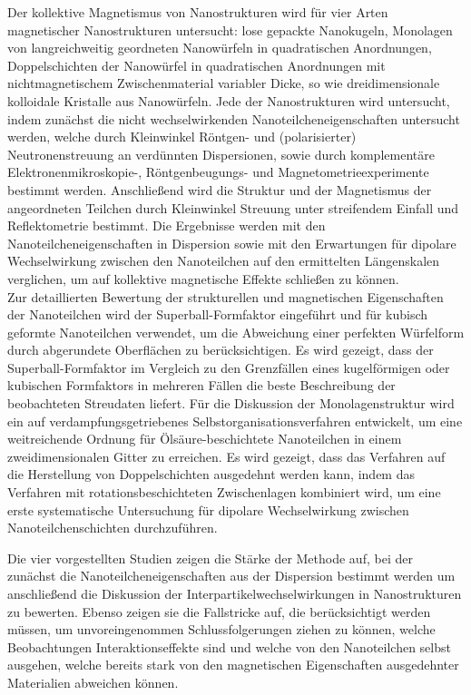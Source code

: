 \documentclass[\main/dresen_thesis.tex]{subfiles}
\begin{document}
  Der kollektive Magnetismus von Nanostrukturen wird für vier Arten magnetischer Nanostrukturen untersucht: lose gepackte Nanokugeln, Monolagen von langreichweitig geordneten Nanowürfeln in quadratischen Anordnungen, Doppelschichten der Nanowürfel in quadratischen Anordnungen mit nichtmagnetischem Zwischenmaterial variabler Dicke, so wie dreidimensionale kolloidale Kristalle aus Nanowürfeln.
  Jede der Nanostrukturen wird untersucht, indem zunächst die nicht wechselwirkenden Nanoteilcheneigenschaften untersucht werden, welche durch Kleinwinkel Röntgen- und (polarisierter) Neutronenstreuung an verdünnten Dispersionen, sowie durch komplementäre Elektronenmikroskopie-, Röntgenbeugungs- und Magnetometrieexperimente bestimmt werden.
  Anschließend wird die Struktur und der Magnetismus der angeordneten Teilchen durch Kleinwinkel Streuung unter streifendem Einfall und Reflektometrie bestimmt.
  Die Ergebnisse werden mit den Nanoteilcheneigenschaften in Dispersion sowie mit den Erwartungen für dipolare Wechselwirkung zwischen den Nanoteilchen auf den ermittelten Längenskalen verglichen, um auf kollektive magnetische Effekte schließen zu können.
  \\

  Zur detaillierten Bewertung der strukturellen und magnetischen Eigenschaften der Nanoteilchen wird der Superball-Formfaktor eingeführt und für kubisch geformte Nanoteilchen verwendet, um die Abweichung einer perfekten Würfelform durch abgerundete Oberflächen zu berücksichtigen.
  Es wird gezeigt, dass der Superball-Formfaktor im Vergleich zu den Grenzfällen eines kugelförmigen oder kubischen Formfaktors in mehreren Fällen die beste Beschreibung der beobachteten Streudaten liefert.
  Für die Diskussion der Monolagenstruktur wird ein auf verdampfungsgetriebenes Selbstorganisationsverfahren entwickelt, um eine weitreichende Ordnung für Ölsäure-beschichtete Nanoteilchen in einem zweidimensionalen Gitter zu erreichen.
  Es wird gezeigt, dass das Verfahren auf die Herstellung von Doppelschichten ausgedehnt werden kann, indem das Verfahren mit rotationsbeschichteten Zwischenlagen kombiniert wird, um eine erste systematische Untersuchung für dipolare Wechselwirkung zwischen Nanoteilchenschichten durchzuführen.

  Die vier vorgestellten Studien zeigen die Stärke der Methode auf, bei der zunächst die Nanoteilcheneigenschaften aus der Dispersion bestimmt werden um anschließend die Diskussion der Interpartikelwechselwirkungen in Nanostrukturen zu bewerten. Ebenso zeigen sie die Fallstricke auf, die berücksichtigt werden müssen, um unvoreingenommen Schlussfolgerungen ziehen zu können, welche Beobachtungen Interaktionseffekte sind und welche von den Nanoteilchen selbst ausgehen, welche bereits stark von den magnetischen Eigenschaften ausgedehnter Materialien abweichen können.
\end{document}
